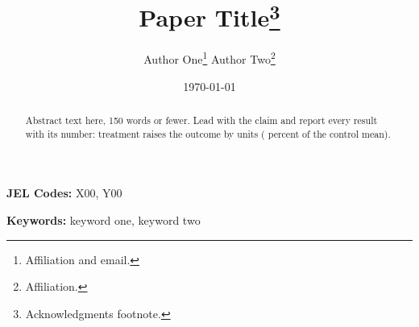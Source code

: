 \documentclass[12pt]{article}
\title{Paper Title\thanks{Acknowledgments footnote.}}
\author{
Author One\thanks{Affiliation and email.} \quad
Author Two\thanks{Affiliation.}
}
\date{\today}
\newcommand{\1}[1]{\mathds{1}\left[#1\right]}
\begin{document}
\maketitle
\thispagestyle{empty}

\begin{abstract}
\noindent \singlespacing
Abstract text here, 150 words or fewer. Lead with the claim and report every
result with its number: treatment raises the outcome by 
units ( percent of the control mean).
\end{abstract}

\vspace{1em}
\noindent \textbf{JEL Codes:} X00, Y00

\vspace{0.5em}
\noindent \textbf{Keywords:} keyword one, keyword two

\newpage
\setcounter{page}{1}







\clearpage
\small \printbibliography

\clearpage
\normalsize
\begin{appendices}

\end{appendices}
\end{document}
